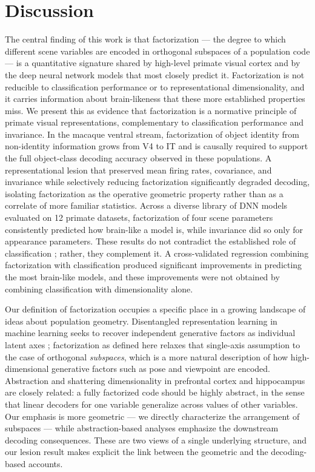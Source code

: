 \documentclass[11pt]{article}
\begin{document}
\section{Discussion}

The central finding of this work is that factorization --- the degree to
which different scene variables are encoded in orthogonal subspaces of a
population code --- is a quantitative signature shared by high-level
primate visual cortex and by the deep neural network models that most
closely predict it. Factorization is not reducible to classification
performance or to representational dimensionality, and it carries
information about brain-likeness that these more established properties
miss. We present this as evidence that factorization is a normative
principle of primate visual representations, complementary to classification
performance and invariance. In the macaque ventral stream, factorization of object
identity from non-identity information grows from V4 to IT and is
causally required to support the full object-class decoding accuracy
observed in these populations. A representational lesion that preserved
mean firing rates, covariance, and invariance while selectively reducing
factorization significantly degraded decoding, isolating factorization as
the operative geometric property rather than as a correlate of more
familiar statistics. Across a diverse library of DNN models evaluated on
12 primate datasets, factorization of four scene parameters consistently
predicted how brain-like a model is, while invariance did so only for
appearance parameters. These results do not contradict the established role
of classification \citep{yamins2014performance, majaj2015simple}; rather,
they complement it. A cross-validated regression combining factorization
with classification produced significant improvements in predicting the
most brain-like models, and these improvements were not obtained by
combining classification with dimensionality alone.

Our definition of factorization occupies a specific place in a growing
landscape of ideas about population geometry. Disentangled representation
learning in machine learning seeks to recover independent generative
factors as individual latent axes \citep{higgins2017beta}; factorization as
defined here relaxes that single-axis assumption to the case of orthogonal
\emph{subspaces}, which is a more natural description of how
high-dimensional generative factors such as pose and viewpoint are encoded.
Abstraction and shattering dimensionality in prefrontal cortex and
hippocampus \citep{bernardi2020geometry, rigotti2013importance, fusi2016why}
are closely related: a fully factorized code should be highly abstract, in
the sense that linear decoders for one variable generalize across values of
other variables. Our emphasis is more geometric --- we directly characterize
the arrangement of subspaces --- while abstraction-based analyses emphasize
the downstream decoding consequences. These are two views of a single
underlying structure, and our lesion result makes explicit the link between
the geometric and the decoding-based accounts.
\end{document}
